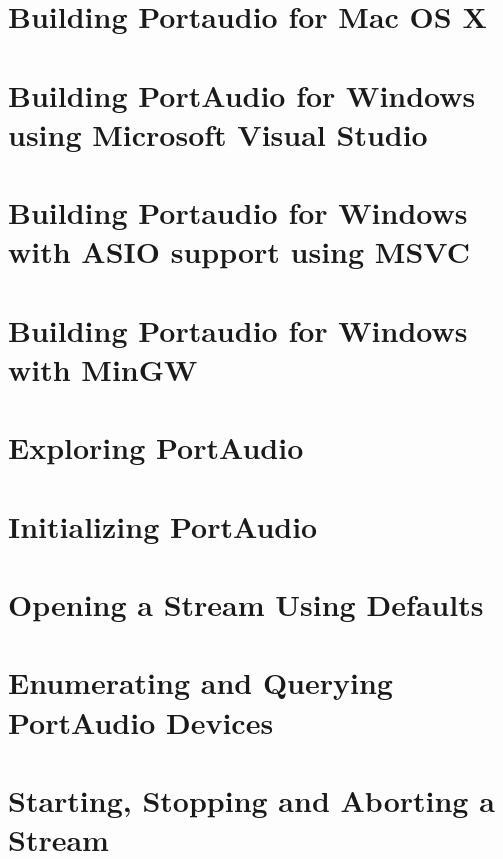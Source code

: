 \documentclass[twoside]{book}
\newcommand{\+}{\discretionary{\mbox{\scriptsize$\hookleftarrow$}}{}{}}
\begin{document}
\chapter{Building Portaudio for Mac OS X}
\label{compile_mac_coreaudio}
\hypertarget{compile_mac_coreaudio}{}

\chapter{Building Port\+Audio for Windows using Microsoft Visual Studio}
\label{compile_windows}
\hypertarget{compile_windows}{}

\chapter{Building Portaudio for Windows with A\+S\+IO support using M\+S\+VC}
\label{compile_windows_asio_msvc}
\hypertarget{compile_windows_asio_msvc}{}

\chapter{Building Portaudio for Windows with Min\+GW}
\label{compile_windows_mingw}
\hypertarget{compile_windows_mingw}{}

\chapter{Exploring Port\+Audio}
\label{exploring}
\hypertarget{exploring}{}

\chapter{Initializing Port\+Audio}
\label{initializing_portaudio}
\hypertarget{initializing_portaudio}{}

\chapter{Opening a Stream Using Defaults}
\label{open_default_stream}
\hypertarget{open_default_stream}{}

\chapter{Enumerating and Querying Port\+Audio Devices}
\label{querying_devices}
\hypertarget{querying_devices}{}

\chapter{Starting, Stopping and Aborting a Stream}
\label{start_stop_abort}
\hypertarget{start_stop_abort}{}

\end{document}
